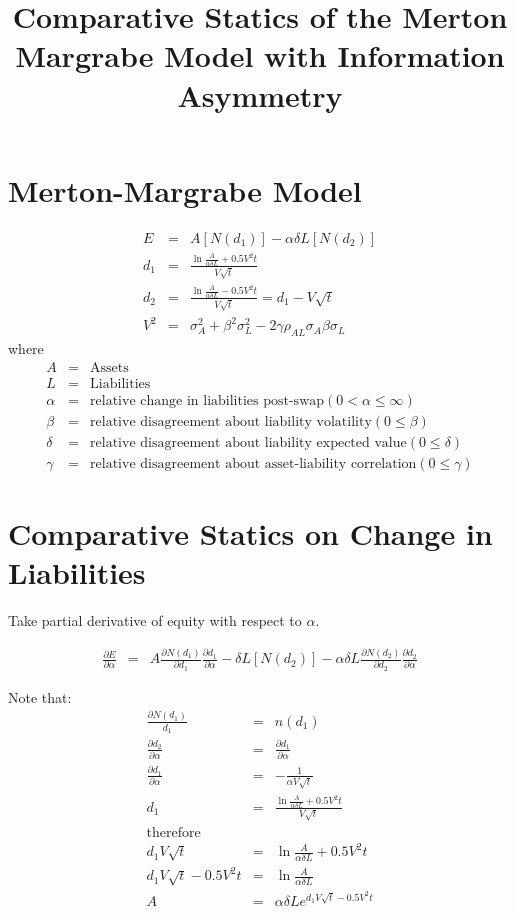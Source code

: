 \documentclass[11pt]{article}
\title{Comparative Statics of the Merton Margrabe Model with Information Asymmetry}
\begin{document}
\section{Merton-Margrabe Model}
\begin{eqnarray}
E&=&A \left[N\left(d_1\right)\right]- \alpha \delta L \left[N\left(d_2\right)\right] \nonumber \\
d_1&=&\frac{\ln\frac{A}{\alpha \delta L}+0.5 V^2 t}{V\sqrt{t}} \nonumber \\ 
d_2&=&\frac{\ln\frac{A}{\alpha \delta L}-0.5 V^2 t}{V\sqrt{t}}=d_1-V\sqrt{t} \nonumber \\
V^2&=&\sigma_A^2 + \beta^2 \sigma_L^2 -2 \gamma \rho_{AL} \sigma_A \beta \sigma_L  \nonumber
\end{eqnarray}
where 
\begin{eqnarray}
A&=&\mbox{Assets}\nonumber \\
L&=&\mbox{Liabilities} \nonumber \\
\alpha&=& \mbox{relative change in liabilities post-swap} \left(0 < \alpha \le \infty \right) \nonumber \\
\beta&=&\mbox{relative disagreement about liability volatility} \left(0\le \beta \right)\nonumber \\
\delta&=& \mbox{relative disagreement about liability expected value} \left(0\le \delta \right) \nonumber \\
\gamma&=& \mbox{relative disagreement about asset-liability correlation} \left(0\le \gamma \right) \nonumber
\end{eqnarray}


\section{Comparative Statics on Change in Liabilities}

Take partial derivative of equity with respect to $\alpha$.

\begin{eqnarray}
\frac{\partial E}{\partial \alpha}&=&A \frac{\partial N\left(d_1\right)}{\partial d_1}\frac{\partial d_1}{\partial \alpha}-\delta L \left[N\left(d_2\right)\right]-\alpha \delta L \frac{\partial N\left(d_2\right)}{\partial d_2}\frac{\partial d_2}{\partial \alpha}
\end{eqnarray}

Note that:
\begin{eqnarray}
\frac{\partial N\left(d_1\right)}{d_1}&=&n\left(d_1\right) \nonumber\\
\frac{\partial d_2}{\partial \alpha}&=&\frac{\partial d_1}{\partial \alpha} \nonumber\\
\frac{\partial d_1}{\partial \alpha}&=&-\frac{1}{\alpha V \sqrt{t}} \nonumber\\
d_1&=&\frac{\ln\frac{A}{\alpha \delta L}+0.5 V^2 t}{V\sqrt{t}} \nonumber \\
\mbox{therefore} &&\nonumber \\
d_1 V\sqrt{t}&=&\ln\frac{A}{\alpha \delta L}+0.5 V^2 t\nonumber\\
d_1 V\sqrt{t}-0.5 V^2 t&=&\ln\frac{A}{\alpha \delta L} \nonumber\\
A&=&\alpha \delta L e^{d_1 V\sqrt{t}-0.5 V^2 t }
\end{eqnarray}
\end{document}
